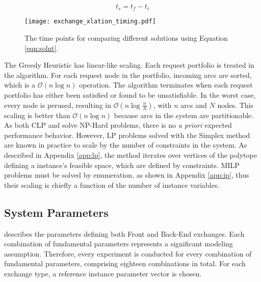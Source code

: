 \begin{equation}\label{eqn:solnt}
t_s = t_f - t_i
\end{equation}

\begin{figure}
  \begin{center}
    \texttt{[image: exchange\_xlation\_timing.pdf]}
    \caption{
      \label{fig:dre_time}
      The time points for comparing different solutions using Equation \ref{eqn:solnt}.}
  \end{center}
\end{figure}

The Greedy Heuristic has linear-like scaling. Each request portfolio is treated
in the algorithm. For each request node in the portfolio, incoming arcs are
sorted, which is a $\mathcal{O}(n\log{}n)$ operation. The algorithm terminates
when each request portfolio has either been satisfied or found to be
unsatisfiable. In the worst case, every node is perused, resulting in
$\mathcal{O}(n\log{}\frac{n}{N})$, with $n$ arcs and $N$ nodes. This scaling is
better than $\mathcal{O}(n\log{}n)$ because arcs in the system are
partitionable. As both CLP and \cbc solve NP-Hard problems, there is no
\textit{a priori} expected performance behavior. However, LP problems solved
with the Simplex method are known in practice to scale by the number of
constraints in the system. As described in Appendix \ref{app:lp}, the method
iterates over vertices of the polytope defining a instance's feasible space,
which are defined by constraints. MILP problems must be solved by enumeration,
as shown in Appendix \ref{app:ip}, thus their scaling is chiefly a function of
the number of instance variables.

\subsection{System Parameters}

 describes the parameters defining both Front
and Back-End exchanges. Each combination of fundamental parameters represents a
significant modeling assumption. Therefore, every experiment is conducted for
every combination of fundamental parameters, comprising eighteen combinations in
total. For each exchange type, a reference instance parameter vector is
chosen. 

